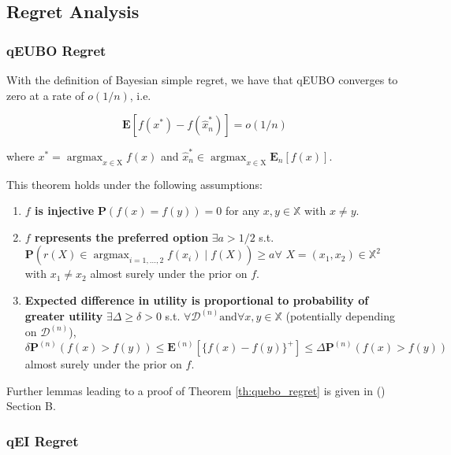 \documentclass[
  letterpaper,
  DIV=11,
  numbers=noendperiod,
  oneside]{scrreprt}
\theoremstyle{remark}
\begin{document}
\subsection{Regret Analysis}\label{regret-analysis}

\subsubsection*{qEUBO Regret}\label{qeubo-regret}

With the definition of Bayesian simple regret, we have that qEUBO
converges to zero at a rate of \(o(1/n)\), i.e.

\[\label{th:quebo_regret}
\mathbf{E}\left[f\left(x^*\right)-f\left(\widehat{x}_n^*\right)\right]=o(1 / n)\]

where \(x^*=\operatorname{argmax}_{x \in \mathrm{X}} f(x)\) and
\(\widehat{x}_n^* \in \operatorname{argmax}_{x \in \mathrm{X}} \mathbf{E}_n[f(x)]\).

This theorem holds under the following assumptions:

\begin{enumerate}
\def\labelenumi{\arabic{enumi}.}
\item
  \textbf{\(f\) is injective} \(\mathbf{P}(f(x)=f(y))=0\) for any
  \(x, y \in \mathbb{X}\) with \(x \neq y\).
\item
  \textbf{\(f\) represents the preferred option} \(\exists a>1 / 2\)
  s.t.
  \(\mathbf{P}\left(r(X) \in \operatorname{argmax}_{i=1, \ldots, 2} f\left(x_i\right) \mid f(X)\right) \geq a \forall\)
  \(X=\left(x_1, x_2\right) \in \mathbb{X}^2\) with \(x_1 \neq x_2\)
  almost surely under the prior on \(f\).
\item
  \textbf{Expected difference in utility is proportional to probability
  of greater utility} \(\exists \Delta \geq \delta>0\) s.t.
  \(\forall \mathcal{D}^{(n)} \text{and} \forall x, y \in \mathbb{X}\)
  (potentially depending on \(\mathcal{D}^{(n)}\)),
  \[\delta \mathbf{P}^{(n)}(f(x)>f(y)) \leq \mathbf{E}^{(n)}\left[\{f(x)-f(y)\}^{+}\right] \leq \Delta \mathbf{P}^{(n)}(f(x)>f(y))\]
  almost surely under the prior on \(f\).
\end{enumerate}

Further lemmas leading to a proof of Theorem
\hyperref[th:quebo_regret]{{[}th:quebo\_regret{]}} is given in
() Section B.

\subsubsection*{qEI Regret}\label{qei-regret}
\end{document}
